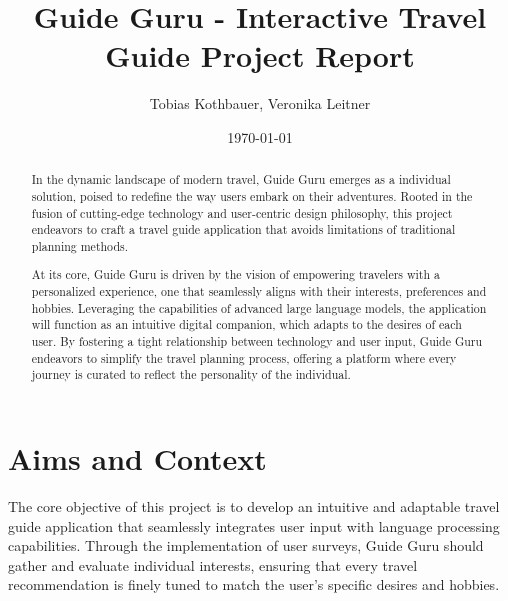 \documentclass[english,notitlepage,smartquotes]{hgbreport}
\begin{document}

\author{Tobias Kothbauer, Veronika Leitner}                    %
\title{Guide Guru - Interactive Travel Guide Project Report}	                 %
\date{\today}

\maketitle

\begin{abstract}\noindent
In the dynamic landscape of modern travel, Guide Guru emerges as a individual solution, poised to redefine the way users embark on their adventures. Rooted in the fusion of cutting-edge technology and user-centric design philosophy, this project endeavors to craft a travel guide application that avoids limitations of traditional planning methods. 

\bigskip
\noindent At its core, Guide Guru is driven by the vision of empowering travelers with a personalized experience, one that seamlessly aligns with their interests, preferences and hobbies. Leveraging the capabilities of advanced large language models, the application will function as an intuitive digital companion, which adapts to the desires of each user. By fostering a tight relationship between technology and user input, Guide Guru endeavors to simplify the travel planning process, offering a platform where every journey is curated to reflect the personality of the individual. 

\bigskip
\noindent
\end{abstract}

\tableofcontents

\chapter{Aims and Context}

The core objective of this project is to develop an intuitive and adaptable travel guide application that seamlessly integrates user input with language processing capabilities. Through the implementation of user surveys, Guide Guru should gather and evaluate individual interests, ensuring that every travel recommendation is finely tuned to match the user's specific desires and hobbies.
\end{document}
